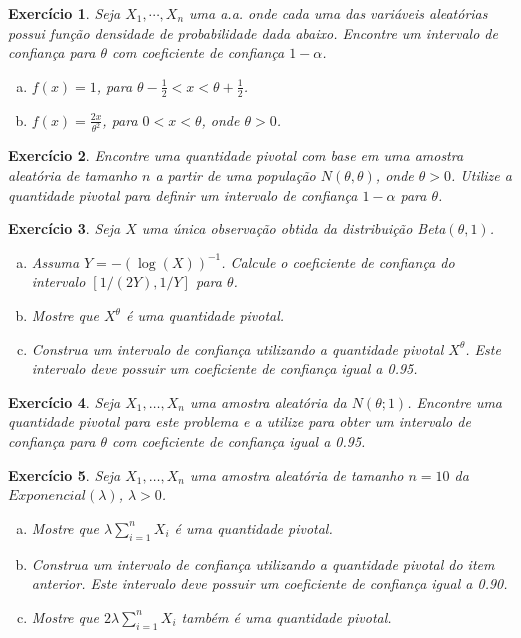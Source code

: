 \documentclass[letter,11pt]{article}
\newtheorem{exer}{Exercício}
\begin{document}
\begin{exer} \rm %
Seja $X_1,\cdots,X_{n}$ uma a.a. onde cada uma das variáveis aleatórias possui função densidade de probabilidade dada abaixo. Encontre um intervalo de confiança para $\theta$ com coeficiente de confiança $1-\alpha$.
\begin{enumerate}[a)]
  \item $f(x)=1$, para $\theta-\frac{1}{2}<x<\theta+\frac{1}{2}$.
  \item $f(x)=\frac{2x}{\theta^2}$, para $0<x<\theta$, onde $\theta>0$.
\end{enumerate}
\end{exer}


\begin{exer} \rm
Encontre uma quantidade pivotal com base em uma amostra aleatória de tamanho $n$ a partir de uma população $N(\theta,\theta)$, onde $\theta>0$. Utilize a quantidade pivotal para definir um intervalo de confiança $1-\alpha$ para $\theta$.
\end{exer}


\begin{exer} \rm
Seja $X$ uma única observação obtida da distribuição Beta$(\theta,1)$.
\begin{enumerate}[a)]
  \item Assuma $Y = -(\log(X))^{-1}$. Calcule o coeficiente de confiança do intervalo $[1/(2Y), 1/Y]$ para $\theta$. 
  \item Mostre que $X^{\theta}$ é uma quantidade pivotal.
  \item Construa um intervalo de confiança utilizando a quantidade pivotal $X^{\theta}$. Este intervalo deve
possuir um coeficiente de confiança igual a 0.95.
\end{enumerate}
\end{exer}



\begin{exer} \rm
Seja $X_1, \ldots, X_n$ uma amostra aleatória da $N(\theta; 1)$. Encontre uma quantidade pivotal para este problema e a utilize para obter um intervalo de confiança para $\theta$ com coeficiente de confiança igual a 0.95.
\end{exer}


\begin{exer} \rm
Seja $X_1, \ldots, X_n$ uma amostra aleatória de tamanho $n = 10$ da $Exponencial(\lambda)$, $\lambda > 0$.
\begin{enumerate}[a)]
  \item Mostre que $\lambda \sum_{i=1}^n X_i$ é uma quantidade pivotal.
  \item Construa um intervalo de confiança utilizando a quantidade pivotal do item anterior. Este intervalo deve possuir um coeficiente de confiança igual a 0.90.
  \item Mostre que $2\lambda \sum_{i=1}^n X_i$ também é uma quantidade pivotal.
\end{enumerate}
\end{exer}
\end{document}
